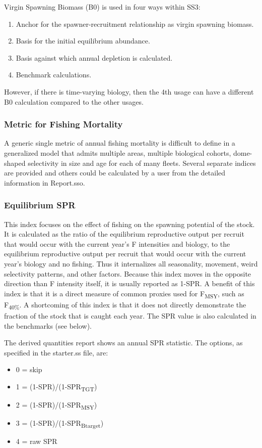 Virgin Spawning Biomass (B0) is used in four ways within SS3:
\begin{enumerate}
	\item Anchor for the spawner-recruitment relationship as virgin spawning biomass.
	\item Basis for the initial equilibrium abundance. 
	\item Basis against which annual depletion is calculated.
	\item Benchmark calculations.
\end{enumerate}
However, if there is time-varying biology, then the 4th usage can have a different B0 calculation compared to the other usages.

\subsubsection{Metric for Fishing Mortality}
A generic single metric of annual fishing mortality is difficult to define in a generalized model that admits multiple areas, multiple biological cohorts, dome-shaped selectivity in size and age for each of many fleets. Several separate indices are provided and others could be calculated by a user from the detailed information in Report.sso.

\subsubsection{Equilibrium SPR}
This index focuses on the effect of fishing on the spawning potential of the stock. It is calculated as the ratio of the equilibrium reproductive output per recruit that would occur with the current year's F intensities and biology, to the equilibrium reproductive output per recruit that would occur with the current year's biology and no fishing. Thus it internalizes all seasonality, movement, weird selectivity patterns, and other factors. Because this index moves in the opposite direction than F intensity itself, it is usually reported as 1-SPR. A benefit of this index is that it is a direct measure of common proxies used for F\textsubscript{MSY}, such as F\textsubscript {40\%}. A shortcoming of this index is that it does not directly demonstrate the fraction of the stock that is caught each year. The SPR value is also calculated in the benchmarks (see below). 

The derived quantities report shows an annual SPR statistic. The options, as specified in the starter.ss file, are:
\begin{itemize}
	\item 0 = skip
	\item 1 = (1-SPR)/(1-SPR\textsubscript{TGT})
	\item 2 = (1-SPR)/(1-SPR\textsubscript{MSY})
	\item 3 = (1-SPR)/(1-SPR\textsubscript{Btarget})
	\item 4 = raw SPR
\end{itemize}

